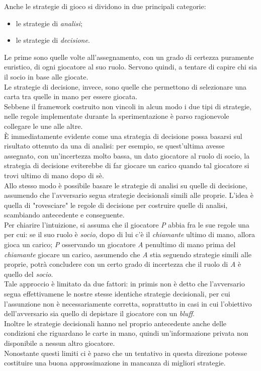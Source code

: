 Anche le strategie di gioco si dividono in due principali categorie:
\begin{itemize}
   \item le strategie di \emph{analisi};
   \item le strategie di \emph{decisione}.
\end{itemize}

Le prime sono quelle volte all'assegnamento, con un grado di certezza puramente euristico, di ogni giocatore al suo ruolo.
Servono quindi, a tentare di capire chi sia il socio in base alle giocate.\\
Le strategie di decisione, invece, sono quelle che permettono di selezionare una carta tra quelle in mano per essere giocata.\\
Sebbene il framework costruito non vincoli in alcun modo i due tipi di strategie, nelle regole implementate durante la sperimentazione  è parso ragionevole collegare le une alle altre.\\
È immediatamente evidente come una strategia di decisione possa basarsi sul risultato ottenuto da una di analisi: per esempio, se quest'ultima avesse assegnato, con un'incertezza molto bassa, un dato giocatore al ruolo di socio, la strategia di decisione eviterebbe di far giocare un carico quando tal giocatore si trovi ultimo di mano dopo di sè.\\

Allo stesso modo è possibile basare le strategie di analisi su quelle di decisione, assumendo che l'avversario segua strategie decisionali simili alle proprie.
L'idea è quella di "rovesciare" le regole di decisione per costruire quelle di analisi, scambiando antecedente e conseguente.\\
Per chiarire l'intuizione, si assuma che il giocatore \emph{P} abbia fra le sue regole una per cui: se il suo ruolo è \emph{socio}, dopo di lui c'è il \emph{chiamante} ultimo di mano, allora gioca un carico; \emph{P} osservando un giocatore \emph{A} penultimo di mano prima del \emph{chiamante} giocare un carico, assumendo che \emph{A} stia seguendo strategie simili alle proprie, potrà concludere con un certo grado di incertezza che il ruolo di \emph{A} è quello del \emph{socio}.\\
Tale approccio è limitato da due fattori: in primis non è detto che l'avversario segua effettivamene le nostre stesse identiche strategie decisionali, per cui l'assunzione non è necessariamente corretta, soprattutto in casi in cui l'obiettivo dell'avversario sia quello di depistare il giocatore con un \emph{bluff}.\\
Inoltre le strategie decisionali hanno nel proprio antecedente anche delle condizioni che riguardano le carte in mano, quindi un'informazione privata non disponibile a nessun altro giocatore.\\
Nonostante questi limiti ci è parso che un tentativo in questa direzione potesse costituire una buona approssimazione in mancanza di migliori strategie.\\




